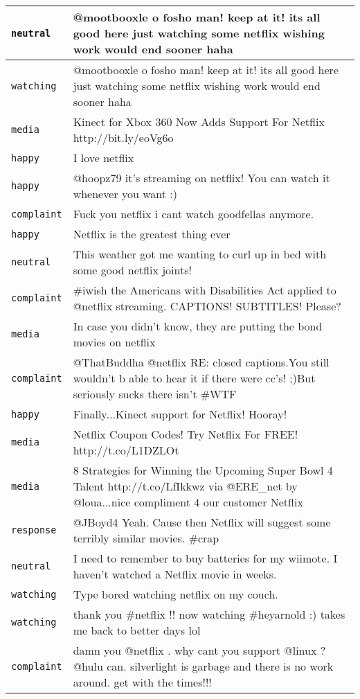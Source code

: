 {\begin{longtable}{|l|p{160mm}|}
         \texttt{neutral} & @mootbooxle o fosho man! keep at it! its all good here just watching some netflix wishing work would end sooner haha
      \tabularnewline\hline
         \texttt{watching} & @mootbooxle o fosho man! keep at it! its all good here just watching some netflix wishing work would end sooner haha
      \tabularnewline\hline
         \texttt{media} & Kinect for Xbox 360 Now Adds Support For Netflix http://bit.ly/eoVg6o
      \tabularnewline\hline
         \texttt{happy} & I love netflix
      \tabularnewline\hline
         \texttt{happy} & @hoopz79 it's streaming on netflix! You can watch it whenever you want :)
      \tabularnewline\hline
         \texttt{complaint} & Fuck you netflix i cant watch goodfellas anymore.
      \tabularnewline\hline
         \texttt{happy} & Netflix is the greatest thing ever
      \tabularnewline\hline
         \texttt{neutral} & This weather got me wanting to curl up in bed with some good netflix joints!
      \tabularnewline\hline
         \texttt{complaint} & \#iwish the Americans with Disabilities Act applied to @netflix streaming. CAPTIONS! SUBTITLES! Please?
      \tabularnewline\hline
         \texttt{media} & In case you didn't know, they are putting the bond movies on netflix
      \tabularnewline\hline
         \texttt{complaint} & @ThatBuddha @netflix RE: closed captions.You still wouldn't b able to hear it if there were cc's! ;)But seriously sucks there isn't \#WTF
      \tabularnewline\hline
         \texttt{happy} & Finally...Kinect support for Netflix! Hooray!
      \tabularnewline\hline
         \texttt{media} & Netflix Coupon Codes! Try Netflix For FREE! http://t.co/L1DZLOt
      \tabularnewline\hline
         \texttt{media} & 8 Strategies for Winning the Upcoming Super Bowl 4 Talent http://t.co/LfIkkwz via @ERE\_net by @loua...nice compliment 4 our customer Netflix
      \tabularnewline\hline
         \texttt{response} & @JBoyd4 Yeah. Cause then Netflix will suggest some terribly similar movies. \#crap
      \tabularnewline\hline
         \texttt{neutral} & I need to remember to buy batteries for my wiimote. I haven't watched a Netflix movie in weeks.
      \tabularnewline\hline
         \texttt{watching} & Type bored watching netflix on my couch.
      \tabularnewline\hline
         \texttt{watching} & thank you \#netflix !! now watching \#heyarnold :) takes me back to better days lol
      \tabularnewline\hline
         \texttt{complaint} & damn you @netflix . why cant you support @linux ? @hulu can. silverlight is garbage and there is no work around. get with the times!!!
      \tabularnewline\hline

\end{longtable}}
